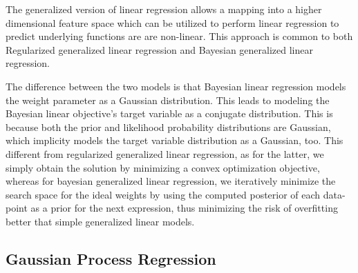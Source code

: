 \documentclass[parskip=full]{scrartcl}
\begin{document}
            The generalized version of linear regression allows a mapping into a higher dimensional feature space which can be utilized to perform linear regression to predict underlying functions are are non-linear. This approach is common to both Regularized generalized linear regression and Bayesian generalized linear regression.

            The difference between the two models is that Bayesian linear regression models the weight parameter as a Gaussian distribution. This leads to modeling the Bayesian linear objective's target variable as a conjugate distribution. This is because both the prior and likelihood probability distributions are Gaussian, which implicity models the target variable distribution as a Gaussian, too. This different from regularized generalized linear regression, as for the latter, we simply obtain the solution by minimizing a convex optimization objective, whereas for bayesian generalized linear regression, we iteratively minimize the search space for the ideal weights by using the computed posterior of each data-point as a prior for the next expression, thus minimizing the risk of overfitting better that simple generalized linear models.
        
    

    \subsection{Gaussian Process Regression} %
    \label{sub:gaussian_process_regression}
    

\end{document}
